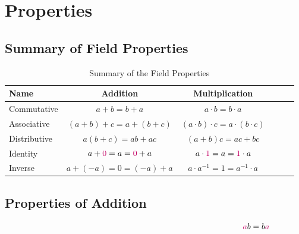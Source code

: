\documentclass[20150903-160354-rs2.2-MarksMathNotebook.tex]{subfiles}
\begin{document}
%
%

\chapter{Properties}

\section{Summary of Field Properties}

\begin{table}[h]
\begin{tabular}{|l|c|c|c|c|c}
\hline
Name 								& Addition 	                & Multiplication  \\
\hline
Commutative							& $a+b=b+a$		            & $a \cdot b = b \cdot a$   \\
\hline
Associative						    & $(a+b)+c = a+(b+c)$ 		& $(a \cdot b) \cdot c = a \cdot(b \cdot c)$ \\
\hline
Distributive	                   &  $a(b+c)=ab+ac$            & $(a+b)c=ac+bc$ \\
\hline
Identity 	                       & $a + \cRed{0} = a = \cRed{0}+a$		        & $a \cdot \cRed{1} = a = \cRed{1} \cdot a$ \\
\hline
Inverse                            & $a + (-a) = 0 = (-a)+a$             & $a \cdot a^{-1}=1 = a^{-1} \cdot a$ \\
\hline
\end{tabular}
\caption{Summary of the Field Properties}\label{tab:tableoffieldproperties}
\end{table}


\section{Properties of Addition}

\begin{property}

\begin{align}
\alert{a}b &= b\alert{a} \label{eq:cpa}
\end{align}
\end{property}
\end{document}
